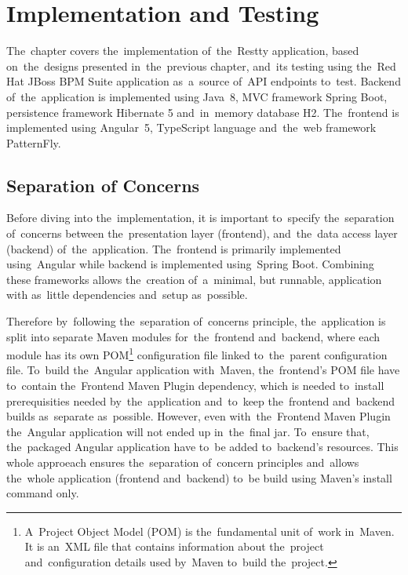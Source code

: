 


\chapter{Implementation and Testing}
The~chapter covers the~implementation of~the~Restty application, based on~the~designs presented
in~the~previous chapter, and~its testing using the~Red Hat JBoss BPM Suite application as~a~source
of~API endpoints to~test. Backend of~the~application is implemented using Java~8, MVC framework
Spring Boot, persistence framework Hibernate 5 and~in~memory database H2. The~frontend is implemented using
Angular~5, TypeScript language and~the~web framework PatternFly.

\section{Separation of Concerns}
Before diving into the~implementation, it is important to~specify the~separation of~concerns between
the~presentation layer (frontend), and~the~data access layer (backend) of~the~application. 
The~frontend is primarily implemented using~Angular while backend is implemented using~Spring Boot. Combining
these frameworks allows the~creation of~a~minimal, but runnable, application with as~little dependencies and~setup as~possible.

Therefore by~following the~separation of~concerns principle, the~application is split into separate Maven modules for~the~frontend
and~backend, where each module has its own POM\footnote{A~Project Object Model (POM) is the~fundamental unit of~work in~Maven.
It is an~XML file that contains information about the~project and~configuration details used by~Maven to~build the~project.} configuration
file linked to~the~parent configuration file. To~build the~Angular application with~Maven, the~frontend's POM file have to~contain 
the~Frontend Maven Plugin dependency, which is needed to~install prerequisities needed by~the~application and~to~keep
the~frontend and~backend builds as~separate as~possible. However, even with~the~Frontend Maven Plugin the~Angular application will not
ended up in~the~final jar. To~ensure that, the~packaged Angular application have to~be added to~backend's resources. This whole approeach
ensures the~separation of~concern principles and~allows the~whole application (frontend and~backend) to~be build using Maven's install command only.



